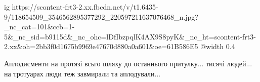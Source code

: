  
 
 
 
 

\ifcmt
  ig https://scontent-frt3-2.xx.fbcdn.net/v/t1.6435-9/118654509_3546562895377292_220597211637076468_n.jpg?_nc_cat=101&ccb=1-5&_nc_sid=b9115d&_nc_ohc=lDfIbzpqlK4AX9S8pyK&_nc_ht=scontent-frt3-2.xx&oh=2bb3f0d1675b9969e47670d880a0a601&oe=61B586E5
  @width 0.4
\fi


Аплодисменти на протязі всьго шляху до останнього притулку... тисячі людей... на
тротуарах люди теж завмирали та аплодували...
